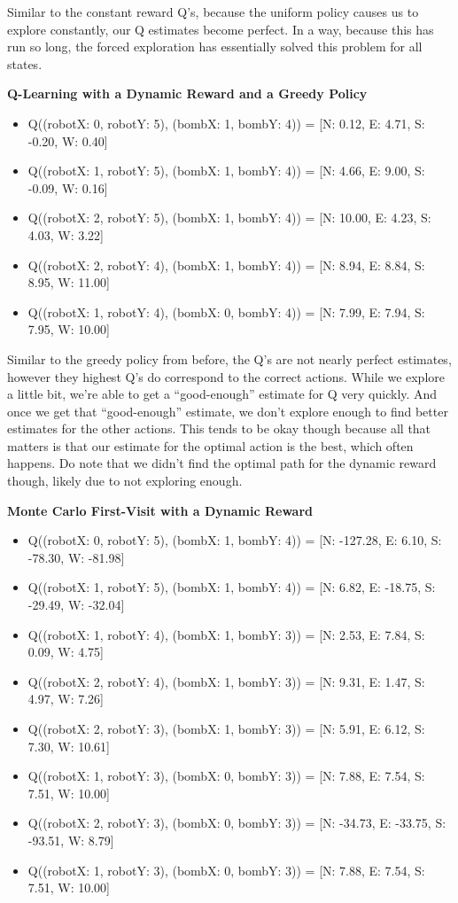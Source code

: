 \documentclass[12pt]{article}
\begin{document}
Similar to the constant reward Q's, because the uniform policy causes us to explore constantly, our Q estimates become perfect. In a way, because this has run so long, the forced exploration has essentially solved this problem for all states.

\textbf{Q-Learning with a Dynamic Reward and a Greedy Policy}
\begin{itemize}
  \item Q((robotX: 0, robotY: 5), (bombX: 1, bombY: 4)) = [N: 0.12, E: 4.71, S: -0.20, W: 0.40]
  \item Q((robotX: 1, robotY: 5), (bombX: 1, bombY: 4)) = [N: 4.66, E: 9.00, S: -0.09, W: 0.16]
  \item Q((robotX: 2, robotY: 5), (bombX: 1, bombY: 4)) = [N: 10.00, E: 4.23, S: 4.03, W: 3.22]
  \item Q((robotX: 2, robotY: 4), (bombX: 1, bombY: 4)) = [N: 8.94, E: 8.84, S: 8.95, W: 11.00]
  \item Q((robotX: 1, robotY: 4), (bombX: 0, bombY: 4)) = [N: 7.99, E: 7.94, S: 7.95, W: 10.00]
\end{itemize}

Similar to the greedy policy from before, the Q's are not nearly perfect estimates, however they highest Q's do correspond to the correct actions. While we explore a little bit, we're able to get a ``good-enough'' estimate for Q very quickly. And once we get that ``good-enough'' estimate, we don't explore enough to find better estimates for the other actions. This tends to be okay though because all that matters is that our estimate for the optimal action is the best, which often happens. Do note that we didn't find the optimal path for the dynamic reward though, likely due to not exploring enough.

\textbf{Monte Carlo First-Visit with a Dynamic Reward}
\begin{itemize}
  \item Q((robotX: 0, robotY: 5), (bombX: 1, bombY: 4)) = [N: -127.28, E: 6.10, S: -78.30, W: -81.98]
  \item Q((robotX: 1, robotY: 5), (bombX: 1, bombY: 4)) = [N: 6.82, E: -18.75, S: -29.49, W: -32.04]
  \item Q((robotX: 1, robotY: 4), (bombX: 1, bombY: 3)) = [N: 2.53, E: 7.84, S: 0.09, W: 4.75]
  \item Q((robotX: 2, robotY: 4), (bombX: 1, bombY: 3)) = [N: 9.31, E: 1.47, S: 4.97, W: 7.26]
  \item Q((robotX: 2, robotY: 3), (bombX: 1, bombY: 3)) = [N: 5.91, E: 6.12, S: 7.30, W: 10.61]
  \item Q((robotX: 1, robotY: 3), (bombX: 0, bombY: 3)) = [N: 7.88, E: 7.54, S: 7.51, W: 10.00]
  \item Q((robotX: 2, robotY: 3), (bombX: 0, bombY: 3)) = [N: -34.73, E: -33.75, S: -93.51, W: 8.79]
  \item Q((robotX: 1, robotY: 3), (bombX: 0, bombY: 3)) = [N: 7.88, E: 7.54, S: 7.51, W: 10.00]
\end{itemize}
\end{document}
